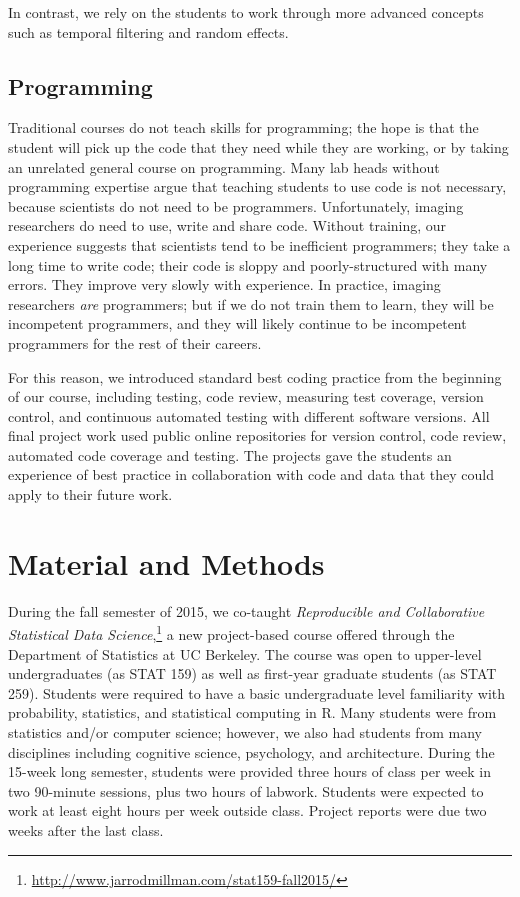 In contrast, we rely on the students to work through more advanced concepts
such as temporal filtering and random effects.

\subsection{Programming}

Traditional courses do not teach skills for programming; the hope is that the
student will pick up the code that they need while they are working, or by
taking an unrelated general course on programming.  Many lab heads without
programming expertise argue that teaching students to use code is not
necessary, because scientists do not need to be programmers.  Unfortunately,
imaging researchers do need to use, write and share code.  Without training,
our experience suggests that scientists tend to be inefficient programmers;
they take a long time to write code; their code is sloppy and
poorly-structured with many errors.  They improve very slowly with experience.
In practice, imaging researchers {\em are} programmers; but if we do not train
them to learn, they will be incompetent programmers, and they will likely
continue to be incompetent programmers for the rest of their careers.

For this reason, we introduced standard best coding practice from the
beginning of our course, including testing, code review, measuring test
coverage, version control, and continuous automated testing with different
software versions. All final project work used public online repositories for
version control, code review, automated code coverage and testing.  The
projects gave the students an experience of best practice in collaboration
with code and data that they could apply to their future work.

\section{Material and Methods}\label{methods}

During the fall semester of 2015, we co-taught \emph{Reproducible and Collaborative
Statistical Data Science},\footnote{\url{http://www.jarrodmillman.com/stat159-fall2015/}}
a new project-based course offered through the Department of Statistics at UC Berkeley.
The course was open to upper-level undergraduates (as STAT 159) as well as
first-year graduate students (as STAT 259).
Students were required to have a basic undergraduate level familiarity with
probability, statistics, and statistical computing in R.
Many students were from statistics and/or computer science; however, we also
had students from many disciplines including cognitive science, psychology, and
architecture.
During the 15-week long semester, students were provided three hours of class
per week in two 90-minute sessions, plus two hours of labwork.
Students were expected to work at least eight hours per week outside class.
Project reports were due two weeks after the last class.

